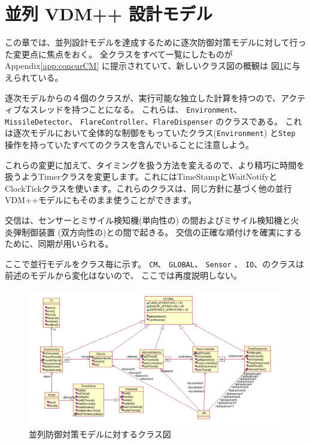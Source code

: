 \documentclass[\pformat,12pt]{jreport}
\begin{document}
\section{並列 VDM++ 設計モデル}\label{sec:concurmod}

この章では、並列設計モデルを達成するために逐次防御対策モデルに対して行った変更点に焦点をおく。
全クラスをすべて一覧にしたものがAppendix\ref{app:concurCM} に提示されていて、新しいクラス図の概観は 図\ref{fig:classdiagconcur}に与えられている。

逐次モデルからの４個のクラスが、実行可能な独立した計算を持つので、アクティブなスレッドを持つことになる。
これらは、 \texttt{Environment}、\texttt{MissileDetector}、 \texttt{FlareController}、\texttt{FlareDispenser} のクラスである。
これは逐次モデルにおいて全体的な制御をもっていたクラス(\texttt{Environment}) と\texttt{Step} 操作を持っていたすべてのクラスを含んでいることに注意しよう。

これらの変更に加えて、タイミングを扱う方法を変えるので、より精巧に時間を扱うようTimerクラスを変更します。これにはTimeStampとWaitNotifyとClockTickクラスを使います。これらのクラスは、同じ方針に基づく他の並行VDM++モデルにもそのまま使うことができます。

交信は、センサーとミサイル検知機(単向性の) の間およびミサイル検知機と火炎弾制御装置 (双方向性の)との間で起きる。
交信の正確な順付けを確実にするために、同期が用いられる。

ここで並行モデルをクラス毎に示す。
 \texttt{CM}、 \texttt{GLOBAL}、 \texttt{Sensor} 、 \texttt{IO}、のクラスは前述のモデルから変化はないので、 ここでは再度説明しない。

\begin{figure}
\begin{center}
\includegraphics[width=\textwidth]{concurCMclassdiag}
\end{center}
\caption{並列防御対策モデルに対するクラス図\label{fig:classdiagconcur}}
\end{figure}
\end{document}
